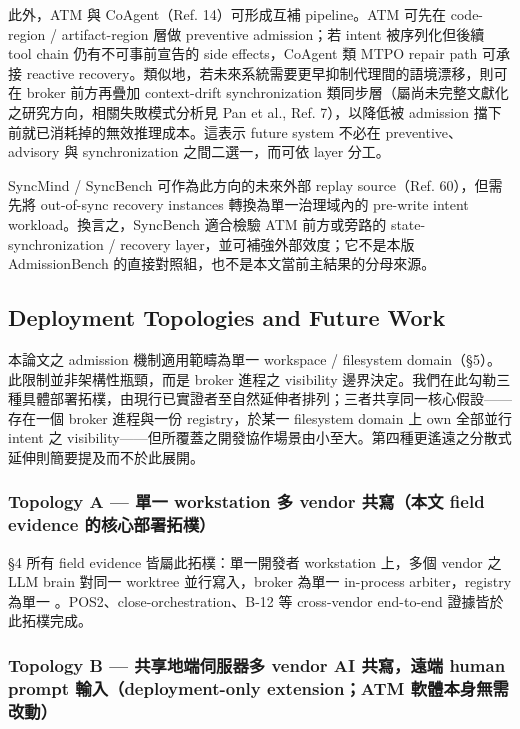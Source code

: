\documentclass[a4paper,fontset=none]{ctexart}
\begin{document}
此外，ATM 與 CoAgent（Ref. 14）可形成互補 pipeline。ATM 可先在 code-region / artifact-region 層做 preventive admission；若 intent 被序列化但後續 tool chain 仍有不可事前宣告的 side effects，CoAgent 類 MTPO repair path 可承接 reactive recovery。類似地，若未來系統需要更早抑制代理間的語境漂移，則可在 broker 前方再疊加 context-drift synchronization 類同步層（屬尚未完整文獻化之研究方向，相關失敗模式分析見 Pan et al., Ref. 7），以降低被 admission 擋下前就已消耗掉的無效推理成本。這表示 future system 不必在 preventive、advisory 與 synchronization 之間二選一，而可依 layer 分工。

SyncMind / SyncBench 可作為此方向的未來外部 replay source（Ref. 60），但需先將 out-of-sync recovery instances 轉換為單一治理域內的 pre-write intent workload。換言之，SyncBench 適合檢驗 ATM 前方或旁路的 state-synchronization / recovery layer，並可補強外部效度；它不是本版 AdmissionBench 的直接對照組，也不是本文當前主結果的分母來源。

\medskip

\subsection{Deployment Topologies and Future Work}

本論文之 admission 機制適用範疇為單一 workspace / filesystem domain（§5）。此限制並非架構性瓶頸，而是 broker 進程之 visibility 邊界決定。我們在此勾勒三種具體部署拓樸，由現行已實證者至自然延伸者排列；三者共享同一核心假設------存在一個 broker 進程與一份 registry，於某一 filesystem domain 上 own 全部並行 intent 之 visibility------但所覆蓋之開發協作場景由小至大。第四種更遙遠之分散式延伸則簡要提及而不於此展開。

\subsubsection*{Topology A --- 單一 workstation 多 vendor 共寫（本文 field evidence 的核心部署拓樸）}

§4 所有 field evidence 皆屬此拓樸：單一開發者 workstation 上，多個 vendor 之 LLM brain 對同一 worktree 並行寫入，broker 為單一 in-process arbiter，registry 為單一 \texttt{}。POS2、close-orchestration、B-12 等 cross-vendor end-to-end 證據皆於此拓樸完成。

\subsubsection*{Topology B --- 共享地端伺服器多 vendor AI 共寫，遠端 human prompt 輸入（deployment-only extension；ATM 軟體本身無需改動）}
\end{document}
